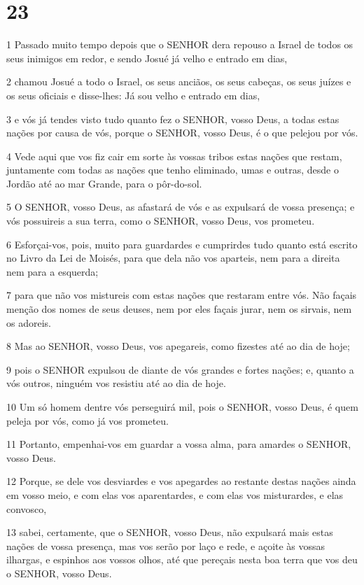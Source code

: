 \chapter{23}

\par 1 Passado muito tempo depois que o SENHOR dera repouso a Israel de todos os seus inimigos em redor, e sendo Josué já velho e entrado em dias,
\par 2 chamou Josué a todo o Israel, os seus anciãos, os seus cabeças, os seus juízes e os seus oficiais e disse-lhes: Já sou velho e entrado em dias,
\par 3 e vós já tendes visto tudo quanto fez o SENHOR, vosso Deus, a todas estas nações por causa de vós, porque o SENHOR, vosso Deus, é o que pelejou por vós.
\par 4 Vede aqui que vos fiz cair em sorte às vossas tribos estas nações que restam, juntamente com todas as nações que tenho eliminado, umas e outras, desde o Jordão até ao mar Grande, para o pôr-do-sol.
\par 5 O SENHOR, vosso Deus, as afastará de vós e as expulsará de vossa presença; e vós possuireis a sua terra, como o SENHOR, vosso Deus, vos prometeu.
\par 6 Esforçai-vos, pois, muito para guardardes e cumprirdes tudo quanto está escrito no Livro da Lei de Moisés, para que dela não vos aparteis, nem para a direita nem para a esquerda;
\par 7 para que não vos mistureis com estas nações que restaram entre vós. Não façais menção dos nomes de seus deuses, nem por eles façais jurar, nem os sirvais, nem os adoreis.
\par 8 Mas ao SENHOR, vosso Deus, vos apegareis, como fizestes até ao dia de hoje;
\par 9 pois o SENHOR expulsou de diante de vós grandes e fortes nações; e, quanto a vós outros, ninguém vos resistiu até ao dia de hoje.
\par 10 Um só homem dentre vós perseguirá mil, pois o SENHOR, vosso Deus, é quem peleja por vós, como já vos prometeu.
\par 11 Portanto, empenhai-vos em guardar a vossa alma, para amardes o SENHOR, vosso Deus.
\par 12 Porque, se dele vos desviardes e vos apegardes ao restante destas nações ainda em vosso meio, e com elas vos aparentardes, e com elas vos misturardes, e elas convosco,
\par 13 sabei, certamente, que o SENHOR, vosso Deus, não expulsará mais estas nações de vossa presença, mas vos serão por laço e rede, e açoite às vossas ilhargas, e espinhos aos vossos olhos, até que pereçais nesta boa terra que vos deu o SENHOR, vosso Deus.
